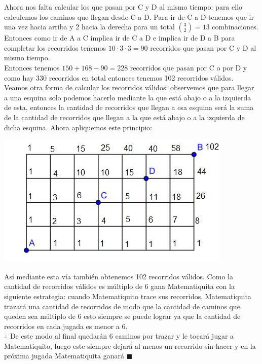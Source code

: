 \documentclass{book}
\begin{document}
\begin{enumerate}
        Ahora nos falta calcular los que pasan por C y D al mismo tiempo: para ello calculemos los caminos que llegan desde C a D. Para ir de C a D tenemos que ir una vez hacia arriba y 2 hacia la derecha para un total $\displaystyle{3 \choose 2}=13$ combinaciones. Entonces como ir de A a C implica ir de C a D e implica ir de D a B para completar los recorridos tenemos $10\cdot 3\cdot 3=90$ recorridos que pasan por C y D al mismo tiempo.\\
        Entonces tenemos $150+168-90=228$ recorridos que pasan por C o por D y como hay 330 recorridos en total entonces tenemos 102 recorridos válidos.\\
        Veamos otra forma de calcular los recorridos válidos: observemos que para llegar a una esquina solo podemos hacerlo mediante la que está abajo o a la izquierda de esta, entonces la cantidad de recorridos que llegan a esa esquina será la suma de la cantidad de recorridos que llegan a la que está abajo o a la izquierda de dicha esquina. Ahora apliquemos este principio:
        \begin{center}
            \includegraphics[scale=1]{imagenes/Combinatoria/Copia13.png}
        \end{center}
        Así mediante esta vía también obtenemos 102 recorridos válidos. Como la cantidad de recorridos válidos es múltiplo de 6 gana Matematiquita con la siguiente estrategia: cuando Matematiquito trace sus recorridos, Matematiquita trazará una cantidad de recorridos de modo que la cantidad de caminos que queden sea múltiplo de 6 esto siempre se puede lograr ya que la cantidad de recorridos en cada jugada es menor a 6. \\
        $\therefore$ De este modo al final quedarán 6 caminos por trazar y le tocará jugar a Matematiquito, luego este siempre dejará al menos un recorrido sin hacer y en la próxima jugada Matematiquita ganará $\blacksquare$\\

\end{enumerate}
\end{document}
